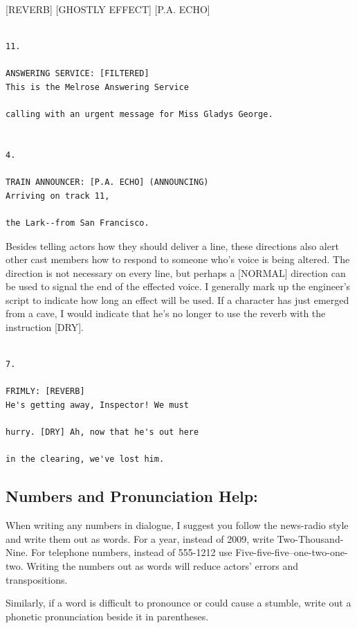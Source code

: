 \documentclass[openleft,oneside,showtrims]{memoir}
\begin{document}
[REVERB] [GHOSTLY EFFECT] [P.A. ECHO]

\lstset{language=fountain,label= ,caption= ,captionpos=b,numbers=none}
\begin{lstlisting}

11. 

ANSWERING SERVICE: [FILTERED]
This is the Melrose Answering Service
  
calling with an urgent message for Miss Gladys George.


4.

TRAIN ANNOUNCER: [P.A. ECHO] (ANNOUNCING)
Arriving on track 11,
  
the Lark--from San Francisco.

\end{lstlisting}

Besides telling actors how they should deliver a line, these directions also alert other cast members how to respond to someone who's voice is being altered. The direction is not necessary on every line, but perhaps a [NORMAL] direction can be used to signal the end of the effected voice. I generally mark up the engineer's script to indicate how long an effect will be used. If a character has just emerged from a cave, I would indicate that he's no longer to use the reverb with the instruction [DRY].

\lstset{language=fountain,label= ,caption= ,captionpos=b,numbers=none}
\begin{lstlisting}

7.

FRIMLY: [REVERB]
He's getting away, Inspector! We must
  
hurry. [DRY] Ah, now that he's out here
  
in the clearing, we've lost him.

\end{lstlisting}

\subsection{Numbers and Pronunciation Help:}
\label{sec:orgd97f9f4}
When writing any numbers in dialogue, I suggest you follow the news-radio style and write them out as words. For a year, instead of 2009, write Two-Thousand-Nine. For telephone numbers, instead of 555-1212 use Five-five-five--one-two-one-two. Writing the numbers out as words will reduce actors' errors and transpositions.

Similarly, if a word is difficult to pronounce or could cause a stumble, write out a phonetic pronunciation beside it in parentheses.
\end{document}
